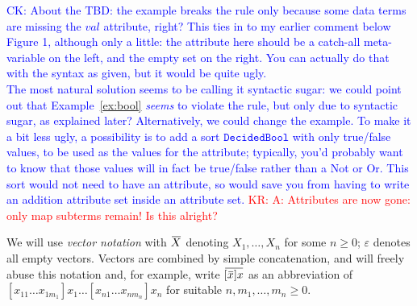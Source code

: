 \documentclass[letterpaper,11pt]{article}
\newcommand{\CK}[1]{\textcolor{blue}{CK: #1}}
\newcommand{\KR}[1]{\textcolor{red}{KR: #1}}
\begin{document}
\CK{About the TBD: the example breaks the rule only because some data terms are
missing the $\mathit{val}$ attribute, right?  This ties in to my earlier
comment below Figure 1, although only a little: the attribute here should be a
catch-all meta-variable on the left, and the empty set on the right.  You can
actually do that with the syntax as given, but it would be quite ugly. \\
The most natural solution seems to be calling it syntactic sugar: we could
point out that Example~\ref{ex:bool} \emph{seems} to violate the rule, but
only due to syntactic sugar, as explained later?  Alternatively, we could
change the example.  To make it a bit less ugly, a possibility is to add a
sort $\mathtt{DecidedBool}$ with only true/false values, to be used as the
values for the attribute; typically, you'd probably want to know that those
values will in fact be true/false rather than a Not or Or.  This sort would
not need to have an attribute, so would save you from having to write an
addition attribute set inside an attribute set.}
\KR{A: Attributes are now gone: only map subterms remain! Is this alright?}

\begin{notation}[vectors]
  We will use \emph{vector notation} with $\ov{X}$ denoting $X_1,…,X_n$ for some $n≥0$; $ε$ denotes
  all empty vectors. Vectors are combined by simple concatenation, and will freely abuse this
  notation and, for example, write $\ov{[\ov{x}]x}$ as an abbreviation of
  $[x_{11}…x_{1m_1}]x_1…[x_{n1}…x_{nm_n}]x_n$ for suitable $n,m_1,…,m_n ≥ 0$.
\end{notation}
\end{document}
